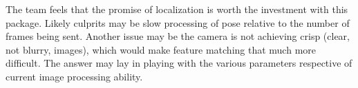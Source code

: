 \begin{itemize}
The team feels that the promise of localization is worth the investment with this package. Likely culprits may be slow processing of pose relative to the number of frames being sent. Another issue may be the camera is not achieving crisp (clear, not blurry, images), which would make feature matching that much more difficult. The answer may lay in playing with the various parameters respective of current image processing ability.
\end{itemize}
